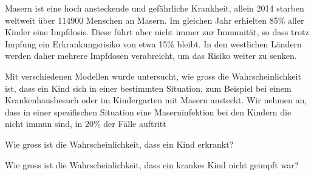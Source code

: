 Masern ist eine hoch ansteckende und gefährliche Krankheit,
allein 2014 starben weltweit über 114900 Menschen an Masern.
Im gleichen Jahr erhielten 85\% aller Kinder eine Impfdosis.
Diese führt aber nicht immer zur Immunität, so dass trotz Impfung
ein Erkrankungsrisiko von etwa 15\% bleibt.
In den westlichen Ländern werden daher mehrere Impfdosen verabreicht,
um das Risiko weiter zu senken.

Mit verschiedenen Modellen wurde untersucht, wie gross die Wahrscheinlichkeit
ist, dass ein Kind sich in einer bestimmten Situation, zum Beispiel
bei einem Krankenhausbesuch oder im Kindergarten mit Masern ansteckt.
Wir nehmen an, dass in einer spezifischen Situation eine Maserninfektion
bei den Kindern die nicht immun sind, in 20\% der Fälle auftritt

\begin{teilaufgaben}
\item
Wie gross ist die Wahrscheinlichkeit, dass ein Kind erkrankt?
\item
Wie gross ist die Wahrscheinlichkeit, dass ein krankes Kind nicht
geimpft war?
\end{teilaufgaben}


